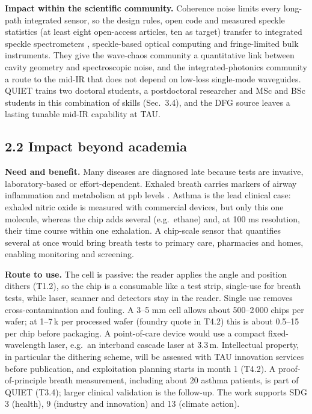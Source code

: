 \documentclass[a4paper,12pt]{article}
\newcommand{\jc}[1]{\textcolor{dkrust}{#1}} %
\newcommand{\nc}[1]{\textcolor{dkleaf}{#1}} %
\begin{document}
\textbf{Impact within the scientific community.} Coherence noise limits every long-path integrated sensor, so the design rules, open code and measured speckle statistics (at least eight open-access articles, ten as target) transfer to integrated speckle spectrometers \cite{Redding2013}, speckle-based optical computing \cite{Arola2026} and fringe-limited bulk instruments. They give the wave-chaos community a quantitative link between cavity geometry and spectroscopic noise, and the integrated-photonics community a route to the mid-IR that does not depend on low-loss single-mode waveguides. QUIET trains two doctoral students, a postdoctoral researcher and MSc and BSc students in this combination of skills (Sec.~3.4), and the DFG source leaves a lasting tunable mid-IR capability at TAU.

\subsection*{2.2 Impact beyond academia}

\textbf{Need and benefit.} Many diseases are diagnosed late because tests are invasive, laboratory-based or effort-dependent. Exhaled breath carries markers of airway inflammation and metabolism at ppb levels \cite{Dweik2011}. \jc{Asthma is the lead clinical case: exhaled nitric oxide is measured with commercial devices, but only this one molecule, whereas the chip adds several (e.g.\ ethane) and, at 100 ms resolution, their time course within one exhalation.} A chip-scale sensor that quantifies several at once would bring breath tests to primary care, pharmacies and homes, enabling monitoring and screening.

\textbf{Route to use.} \nc{The cell is passive: the reader applies the angle and position dithers (T1.2), so the chip is a consumable like a test strip, single-use for breath tests, while laser, scanner and detectors stay in the reader. Single use removes cross-contamination and fouling. A 3--5 mm cell allows about 500--2\,000 chips per wafer; at 1--7\,k\texteuro{} per processed wafer (foundry quote in T4.2) this is about 0.5--15\,\texteuro{} per chip before packaging.} A point-of-care device would use a compact fixed-wavelength laser, e.g.\ an interband cascade laser at 3.3\,\textmu{}m. Intellectual property, in particular the dithering scheme, will be assessed with TAU innovation services before publication, \nc{and exploitation planning starts in month 1 (T4.2). A} proof-of-principle breath measurement, \nc{including about 20 asthma patients,} is part of QUIET (T3.4); \nc{larger} clinical validation is the follow-up. The work supports SDG 3 (health), 9 (industry and innovation) \nc{and 13 (climate action)}.
\end{document}
